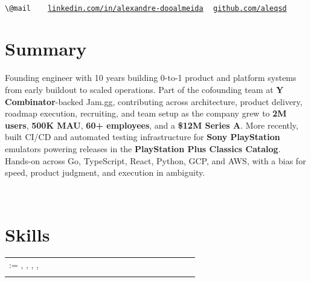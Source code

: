 \documentclass{muratcan_cv}
\makeatletter
\newcommand{\atscontactline}{%
    {\small
    \nolinkurl{\@mail} \ {\color{black}\textbar} \@address \ {\color{black}\textbar}
    \href{\@linkedinaccount}{\nolinkurl{linkedin.com/in/alexandre-dooalmeida}} \ {\color{black}\textbar}
    \href{\@githubaccount}{\nolinkurl{github.com/aleqsd}}}
}
\renewcommand\headerview{
    \hfill
    \begin{minipage}{0.94\linewidth}
        \vspace{2.6ex}
        \centering \name \\[0.14cm]
        \atscontactline \\
    \end{minipage}
    \hfill
}
\renewcommand{\explanationdetail}[1]{%
    \indent \indent \begin{minipage}{0.87\linewidth} \fontsize{8.35pt}{9.7pt}\selectfont #1 \end{minipage} \\[0.03cm]
}
\renewcommand\createskills[1]{%
    \explanationdetail{
        \scriptsize
        \setlength{\tabcolsep}{1.5pt}
        \begin{tabular}{>{\raggedright\arraybackslash}p{0.20\linewidth} >{\raggedright\arraybackslash}p{0.67\linewidth}}
            \@for\thisitem:=#1\do{\thisitem \\[0.03cm]}
        \end{tabular}
    }
}
\makeatother
\begin{document}
\headerview
\vspace{2.6ex}

\section{Summary}
\explanationdetail{
    Founding engineer with 10 years building 0-to-1 product and platform systems from early buildout to scaled operations. Part of the cofounding team at \textbf{Y Combinator}-backed Jam.gg, contributing across architecture, product delivery, roadmap execution, recruiting, and team setup as the company grew to \textbf{2M users}, \textbf{500K MAU}, \textbf{60+ employees}, and a \textbf{\$12M Series A}. More recently, built CI/CD and automated testing infrastructure for \textbf{Sony PlayStation} emulators powering releases in the \textbf{PlayStation Plus Classics Catalog}. Hands-on across Go, TypeScript, React, Python, GCP, and AWS, with a bias for speed, product judgment, and execution in ambiguity.
}
\vspace{1.8ex}

\section{Skills}
\createskills{
    \createskill{Languages}{Go \cpshalf TypeScript \cpshalf Python \cpshalf Rust \cpshalf C++ \cpshalf Java \cpshalf Bash \cpshalf SQL \cpshalf Lua},
    \createskill{Frameworks}{React \cpshalf Node.js \cpshalf Django \cpshalf FastAPI \cpshalf Flask \cpshalf Ruby on Rails \cpshalf Unity},
    \createskill{Cloud / Platform}{GCP \cpshalf Firebase \cpshalf AWS \cpshalf GitHub Actions \cpshalf GitLab CI \cpshalf Docker \cpshalf Kubernetes},
    \createskill{AI / Tooling}{OpenAI \cpshalf Claude \cpshalf RAG (Pinecone) \cpshalf Linear \cpshalf Figma \cpshalf Google/Slack APIs},
    \createskill{Practices}{0-to-1 \cpshalf Shipping \cpshalf Architecture \cpshalf Hiring \cpshalf Leadership \cpshalf Execution \cpshalf Agile}
}
\vspace{-0.1mm}
\end{document}
